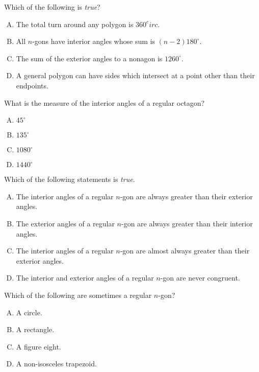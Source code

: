 \documentclass[12pt,letterpaper]{exam}
\begin{document}
\begin{questions}
\vfill



\question Which of the following is \textit{true}?
        \begin{enumerate}[A.]
        \item The total turn around any polygon is $360^circ$.
        \item All $n$-gons have interior angles whose sum is $(n - 2)180^\circ$.
        \item The sum of the exterior angles to a nonagon is $1260^\circ$.
        \item A general polygon can have sides which intersect at a point other than their endpoints. %
        \end{enumerate}



\vfill



\question What is the measure of the interior angles of a regular octagon?
        \begin{enumerate}[A.]
        \item $45^\circ$
        \item $135^\circ$
        \item $1080^\circ$ %
        \item $1440^\circ$
        \end{enumerate}



\vfill



\question Which of the following statements is \textit{true}. 
        \begin{enumerate}[A.]
        \item The interior angles of a regular $n$-gon are always greater than their exterior angles. %
        \item The exterior angles of a regular $n$-gon are always greater than their interior angles.
        \item The interior angles of a regular $n$-gon are almost always greater than their exterior angles.
        \item The interior and exterior angles of a regular $n$-gon are never congruent. 
        \end{enumerate}



\vfill



\question Which of the following are sometimes a regular $n$-gon?
        \begin{enumerate}[A.]
        \item A circle.
        \item A rectangle. 
        \item A figure eight. %
        \item A non-isosceles trapezoid. 
        \end{enumerate}




\end{questions}
\end{document}
